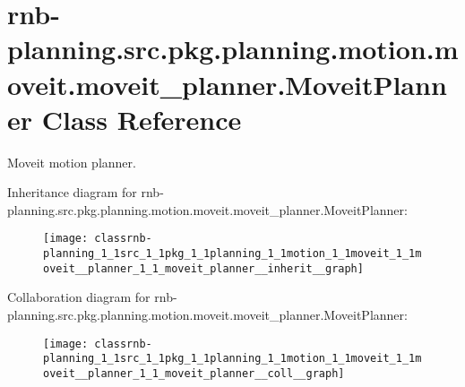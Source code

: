 \hypertarget{classrnb-planning_1_1src_1_1pkg_1_1planning_1_1motion_1_1moveit_1_1moveit__planner_1_1_moveit_planner}{}\section{rnb-\/planning.src.\+pkg.\+planning.\+motion.\+moveit.\+moveit\+\_\+planner.\+Moveit\+Planner Class Reference}
\label{classrnb-planning_1_1src_1_1pkg_1_1planning_1_1motion_1_1moveit_1_1moveit__planner_1_1_moveit_planner}


Moveit motion planner.  




Inheritance diagram for rnb-\/planning.src.\+pkg.\+planning.\+motion.\+moveit.\+moveit\+\_\+planner.\+Moveit\+Planner\+:\nopagebreak
\begin{figure}[H]
\begin{center}
\leavevmode
\texttt{[image: classrnb-planning\_1\_1src\_1\_1pkg\_1\_1planning\_1\_1motion\_1\_1moveit\_1\_1moveit\_\_planner\_1\_1\_moveit\_planner\_\_inherit\_\_graph]}
\end{center}
\end{figure}


Collaboration diagram for rnb-\/planning.src.\+pkg.\+planning.\+motion.\+moveit.\+moveit\+\_\+planner.\+Moveit\+Planner\+:\nopagebreak
\begin{figure}[H]
\begin{center}
\leavevmode
\texttt{[image: classrnb-planning\_1\_1src\_1\_1pkg\_1\_1planning\_1\_1motion\_1\_1moveit\_1\_1moveit\_\_planner\_1\_1\_moveit\_planner\_\_coll\_\_graph]}
\end{center}
\end{figure}
